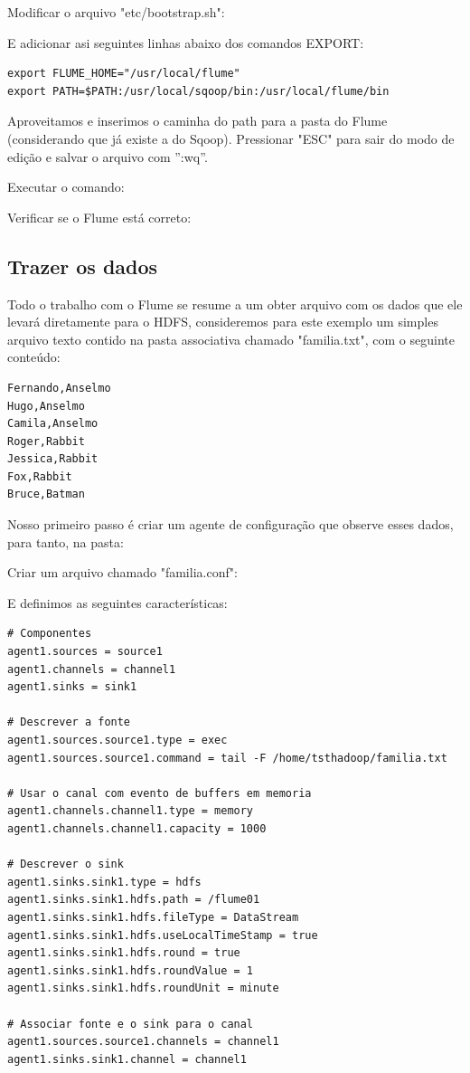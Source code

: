 \documentclass[a4paper,11pt]{article}
\begin{document}
Modificar o arquivo "etc/bootstrap.sh": \\

E adicionar asi seguintes linhas abaixo dos comandos EXPORT:
\begin{lstlisting}[]
export FLUME_HOME="/usr/local/flume"
export PATH=$PATH:/usr/local/sqoop/bin:/usr/local/flume/bin
\end{lstlisting}

Aproveitamos e inserimos o caminha do path para a pasta do Flume (considerando que já existe a do Sqoop). Pressionar "ESC" para sair do modo de edição e salvar o arquivo com ”:wq”. 

Executar o comando: \\

Verificar se o Flume está correto: \\

\subsection{Trazer os dados}
Todo o trabalho com o Flume se resume a um obter arquivo com os dados que ele levará diretamente para o HDFS, consideremos para este exemplo um simples arquivo texto contido na pasta associativa chamado "familia.txt", com o seguinte conteúdo:
\begin{lstlisting}[]
Fernando,Anselmo
Hugo,Anselmo
Camila,Anselmo
Roger,Rabbit
Jessica,Rabbit
Fox,Rabbit
Bruce,Batman
\end{lstlisting}

Nosso primeiro passo é criar um agente de configuração que observe esses dados, para tanto, na pasta: \\

Criar um arquivo chamado "familia.conf": \\

E definimos as seguintes características:
\begin{lstlisting}[]
# Componentes
agent1.sources = source1
agent1.channels = channel1
agent1.sinks = sink1

# Descrever a fonte
agent1.sources.source1.type = exec
agent1.sources.source1.command = tail -F /home/tsthadoop/familia.txt

# Usar o canal com evento de buffers em memoria
agent1.channels.channel1.type = memory
agent1.channels.channel1.capacity = 1000

# Descrever o sink
agent1.sinks.sink1.type = hdfs
agent1.sinks.sink1.hdfs.path = /flume01
agent1.sinks.sink1.hdfs.fileType = DataStream
agent1.sinks.sink1.hdfs.useLocalTimeStamp = true
agent1.sinks.sink1.hdfs.round = true
agent1.sinks.sink1.hdfs.roundValue = 1
agent1.sinks.sink1.hdfs.roundUnit = minute

# Associar fonte e o sink para o canal
agent1.sources.source1.channels = channel1
agent1.sinks.sink1.channel = channel1
\end{lstlisting}
\end{document}
